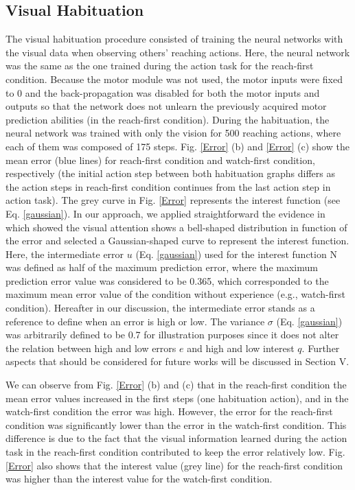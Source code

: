 \documentclass[conference]{IEEEtran}
\begin{document}
\subsection{Visual Habituation}
The visual habituation procedure consisted of training the neural networks with the visual data when observing others' reaching actions. Here, the neural network was the same as the one trained during the action task for the reach-first condition. Because the motor module was not used, the motor inputs were fixed to $0$ and the back-propagation was disabled for both the motor inputs and outputs so that the network does not unlearn the previously acquired motor prediction abilities (in the reach-first condition). During the habituation, the neural network was trained with only the vision for 500 reaching actions, where each of them was composed of 175 steps. Fig. \ref{Error} (b) and \ref{Error} (c) show the mean error (blue lines) for reach-first condition and watch-first condition, respectively (the initial action step between both habituation graphs differs as the action steps in reach-first condition continues from the last action step in action task). The grey curve in Fig. \ref{Error} represents the interest function (see Eq. \ref{gaussian}). In our approach, we applied straightforward the evidence in \cite{kidd2012goldilocks} which showed the visual attention shows a bell-shaped distribution in function of the error and selected a Gaussian-shaped curve to represent the interest function. Here, the intermediate error \(\textit{u}\) (Eq. \ref{gaussian}) used for the interest function \(\text{N}\) was defined as half of the maximum prediction error, where the maximum prediction error value was considered to be 0.365, which corresponded to the maximum mean error value of the condition without experience (e.g., watch-first condition). Hereafter in our discussion, the intermediate error stands as a reference to define when an error is high or low. The variance \(\sigma\) (Eq. \ref{gaussian}) was arbitrarily defined to be 0.7 for illustration purposes since it does not alter the relation between high and low errors \(\textit{e}\) and high and low interest \(\textit{q}\). Further aspects that should be considered for future works will be discussed in Section V. 

We can observe from Fig. \ref{Error} (b) and (c) that in the reach-first condition the mean error values increased in the first steps (one habituation action), and in the watch-first condition the error was high. However, the error for the reach-first condition was significantly lower than the error in the watch-first condition. This difference is due to the fact that the visual information learned during the action task in the reach-first condition contributed to keep the error relatively low. Fig. \ref{Error} also shows that the interest value (grey line) for the reach-first condition was higher than the interest value for the watch-first condition.
\end{document}
